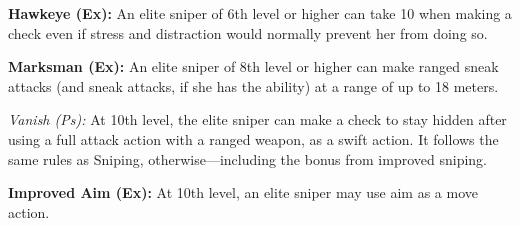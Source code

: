 {\textbf{Hawkeye (Ex):} An elite sniper of 6th level or higher can take 10 when making a  check even if stress and distraction would normally prevent her from doing so.

\textbf{Marksman (Ex):} An elite sniper of 8th level or higher can make ranged sneak attacks (and sneak attacks, if she has the ability) at a range of up to 18 meters.

\textit{Vanish (Ps):} At 10th level, the elite sniper can make a  check to stay hidden after using a full attack action with a ranged weapon, as a swift action. It follows the same rules as Sniping, otherwise---including the bonus from improved sniping.

\textbf{Improved Aim (Ex):} At 10th level, an elite sniper may use aim as a move action.
}